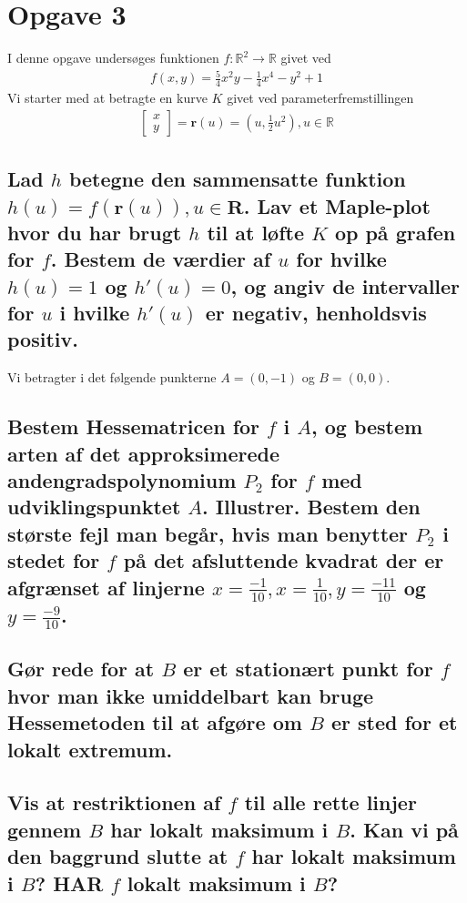 \section{Opgave 3}
I denne opgave undersøges funktionen $f:\mathbb{R}^2 \rightarrow \mathbb{R}$ givet ved
\begin{align*}
f(x,y) = \frac{5}{4} x^2 y-\frac14 x^4 -y^2+1
\end{align*}
Vi starter med at betragte en kurve $K$ givet ved parameterfremstillingen
\begin{align}
\left[
    \begin{array}{c}
        x\\y
    \end{array}
\right] 
= \textbf{r}(u) = \left(u,\frac12 u^2 \right), u\in \mathbb{R}
\end{align}
\subsection{Lad $h$ betegne den sammensatte funktion $h(u)=f(\textbf{r}(u)),u\in \textbf{R}$. Lav et Maple-plot hvor du har brugt $h$ til at løfte $K$ op på grafen for $f$. Bestem de værdier af $u$ for hvilke $h(u)=1$ og $h'(u)=0$, og angiv de intervaller for $u$ i hvilke $h'(u)$ er negativ, henholdsvis positiv.}

Vi betragter i det følgende punkterne $A = (0,-1)$ og $B=(0,0)$.

\subsection{Bestem Hessematricen for $f$ i $A$, og bestem arten af det approksimerede andengradspolynomium $P_2$ for $f$ med udviklingspunktet $A$. Illustrer. Bestem den største fejl man begår, hvis man benytter $P_2$ i stedet for $f$ på det afsluttende kvadrat der er afgrænset af linjerne $x=\frac{-1}{10},x=\frac{1}{10},y=\frac{-11}{10}$ og $y=\frac{-9}{10}$.}

\subsection{Gør rede for at $B$ er et stationært punkt for $f$ hvor man ikke umiddelbart kan bruge Hessemetoden til at afgøre om $B$ er sted for et lokalt extremum.}

\subsection{Vis at restriktionen af $f$ til alle rette linjer gennem $B$ har lokalt maksimum i $B$. Kan vi på den baggrund slutte at $f$ har lokalt maksimum i $B$? HAR $f$ lokalt maksimum i $B$?}




